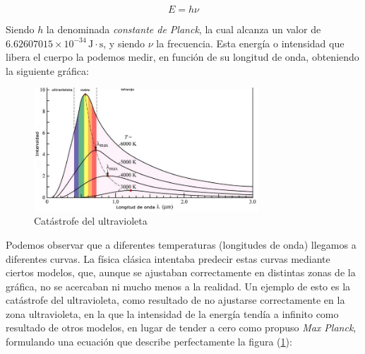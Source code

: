 \documentclass{article}
\numberwithin{equation}{section} %
\begin{document}
        \vspace{5mm}

        \begin{equation}
            E = h \nu
            \label{eq: planck}
        \end{equation}

        \vspace{5mm}

        Siendo \( h \) la denominada \textit{constante de Planck}, la cual alcanza un valor de \( 6.62607015 \times 10^{-34} \, \text{J} \cdot \text{s} \), y siendo \( \nu \) la frecuencia. Esta energía o intensidad que libera el cuerpo la podemos medir, en función de su longitud de onda, obteniendo la siguiente gráfica:

        \vspace{5mm}

        \begin{figure}[h]
            \centering
            \includegraphics[width=0.75\textwidth]{img/Introduccion/catastrofe_ultravioleta.png}
            \caption{Catástrofe del ultravioleta}
            \label{fig: f2}
        \end{figure}

        \vspace{5mm}

        Podemos observar que a diferentes temperaturas (longitudes de onda) llegamos a diferentes curvas. La física clásica intentaba predecir estas curvas mediante ciertos modelos, que, aunque se ajustaban correctamente en distintas zonas de la gráfica, no se acercaban ni mucho menos a la realidad. Un ejemplo de esto es la catástrofe del ultravioleta, como resultado de no ajustarse correctamente en la zona ultravioleta, en la que la intensidad de la energía tendía a infinito como resultado de otros modelos, en lugar de tender a cero como propuso \textit{Max Planck}, formulando una ecuación que describe perfectamente la figura (\ref{fig: f2}):
\end{document}
